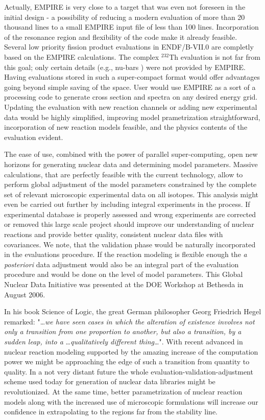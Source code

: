 \documentclass[twocolumn,amsmath,amssymb,10pt,groupedaddress,a4paper]{revtex4}
\begin{document}
Actually, EMPIRE is very close to a target that was even not foreseen in the initial design - a possibility of reducing a modern evaluation of more than 20 thousand lines to a small EMPIRE input file of less than 100 lines. Incorporation of the resonance region and flexibility of the code make it already feasible. Several low priority fission product evaluations in ENDF/B-VII.0 are completly based on the EMPIRE calculations. The complex $^{232}$Th evaluation is not far from this goal; only certain details (e.g., nu-bars ) were not provided by EMPIRE. Having evaluations stored in such a super-compact format would offer advantages going beyond simple saving of the space. User would use EMPIRE as a sort of a processing code to generate cross section and spectra on any desired energy grid.  Updating the evaluation with new reaction channels or adding new experimental data would be highly simplified, improving model prametrization straightforward, incorporation of new reaction models feasible, and the physics contents of the evaluation evident.

The ease of use, combined with the power of parallel super-computing, open new horizons for generating nuclear data and determining model parameters. Massive calculations, that are perfectly feasible with the current technology, allow to perform global adjustment of the model parameters constrained by the complete set of  relevant microscopic experimental data on all isotopes. This analysis might even be carried out further by including integral experiments in the process. If experimental database is properly assessed and wrong experiments are corrected or removed this large scale project should improve our understanding of nuclear reactions and  provide better quality, consistent nuclear data files with covariances. We note, that the validation phase would be naturally incorporated in the evaluations procedure. If the reaction modeling is flexible enough the \textit{a posteriori} data adjustment would also be an integral part of the evaluation procedure and would be done on the level of model parameters. This Global Nuclear Data Initiative was presented at the DOE Workshop at Bethesda in August 2006.

In his book Science of Logic, the great German philosopher Georg Friedrich Hegel remarked:
"\ldots \textit{we have seen cases in which the alteration of existence involves not only a transition from one proportion to another, but also a transition, by a sudden leap, into a} \ldots \textit{qualitatively
different thing}\ldots". With recent advanced in nuclear reaction modeling supported by the amazing increase of the computation power we might be approaching the edge of such a transition from quantity to quality. In a not very distant future the whole evaluation-validation-adjustment scheme used  today for generation of nuclear data libraries might be revolutionized. At the same time, better parametrization of nuclear reaction models along with the increased use of microscopic formulations will increase our confidence in extrapolating to the regions far from the stability line.
\end{document}
